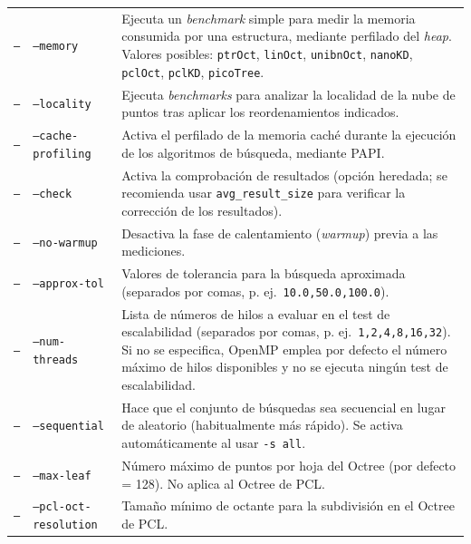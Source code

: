 \begin{longtable}{p{1.6cm} p{3.3cm} p{8.8cm}}
\texttt{--} & \texttt{--memory} &
Ejecuta un \textit{benchmark} simple para medir la memoria consumida por
una estructura, mediante perfilado del \textit{heap}. Valores posibles:
\texttt{ptrOct}, \texttt{linOct}, \texttt{unibnOct}, \texttt{nanoKD},
\texttt{pclOct}, \texttt{pclKD}, \texttt{picoTree}. \\

\texttt{--} & \texttt{--locality} &
Ejecuta \textit{benchmarks} para analizar la localidad de la nube de puntos
tras aplicar los reordenamientos indicados. \\

\texttt{--} & \texttt{--cache-profiling} &
Activa el perfilado de la memoria caché durante la ejecución de los
algoritmos de búsqueda, mediante PAPI. \\

\texttt{--} & \texttt{--check} &
Activa la comprobación de resultados (opción heredada; se recomienda usar
\texttt{avg\_result\_size} para verificar la corrección de los
resultados). \\

\texttt{--} & \texttt{--no-warmup} &
Desactiva la fase de calentamiento (\textit{warmup}) previa a las
mediciones. \\

\texttt{--} & \texttt{--approx-tol} &
Valores de tolerancia para la búsqueda aproximada (separados por comas,
p. ej.\ \texttt{10.0,50.0,100.0}). \\

\texttt{--} & \texttt{--num-threads} &
Lista de números de hilos a evaluar en el test de escalabilidad (separados
por comas, p. ej.\ \texttt{1,2,4,8,16,32}). Si no se especifica, OpenMP
emplea por defecto el número máximo de hilos disponibles y no se ejecuta
ningún test de escalabilidad. \\

\texttt{--} & \texttt{--sequential} &
Hace que el conjunto de búsquedas sea secuencial en lugar de aleatorio
(habitualmente más rápido). Se activa automáticamente al usar
\texttt{-s all}. \\

\texttt{--} & \texttt{--max-leaf} &
Número máximo de puntos por hoja del Octree (por defecto = 128). No aplica
al Octree de PCL. \\

\texttt{--} & \texttt{--pcl-oct- resolution} &
Tamaño mínimo de octante para la subdivisión en el Octree de PCL. \\

\end{longtable}

